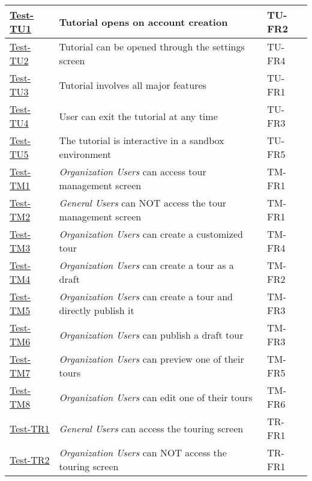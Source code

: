 \documentclass[12pt, titlepage]{article}
\begin{document}
\begin{table}[htpb!]
    \centering
    \begin{tabular}{|l|p{8cm}|p{3cm}|}
        \hline
        \hyperref[itm:Test-TU1]{Test-TU1} & Tutorial opens on account creation & TU-FR2 \\
        \hline
        \hyperref[itm:Test-TU2]{Test-TU2} & Tutorial can be opened through the settings screen & TU-FR4 \\
        \hline
        \hyperref[itm:Test-TU3]{Test-TU3} & Tutorial involves all major features & TU-FR1 \\
        \hline
        \hyperref[itm:Test-TU4]{Test-TU4} & User can exit the tutorial at any time & TU-FR3 \\
        \hline
        \hyperref[itm:Test-TU5]{Test-TU5} & The tutorial is interactive in a sandbox environment & TU-FR5 \\
        \hline
        \hyperref[itm:Test-TM1]{Test-TM1} & \textit{Organization Users} can access tour management screen & TM-FR1 \\
        \hline
        \hyperref[itm:Test-TM2]{Test-TM2} & \textit{General Users} can NOT access the tour management screen & TM-FR1 \\
        \hline
        \hyperref[itm:Test-TM3]{Test-TM3} & \textit{Organization Users} can create a customized tour & TM-FR4 \\
        \hline
        \hyperref[itm:Test-TM4]{Test-TM4} & \textit{Organization Users} can create a tour as a draft & TM-FR2 \\
        \hline
        \hyperref[itm:Test-TM5]{Test-TM5} & \textit{Organization Users} can create a tour and directly publish it & TM-FR3 \\
        \hline
        \hyperref[itm:Test-TM6]{Test-TM6} & \textit{Organization Users} can publish a draft tour & TM-FR3 \\
        \hline
        \hyperref[itm:Test-TM7]{Test-TM7} & \textit{Organization Users} can preview one of their tours & TM-FR5 \\
        \hline
        \hyperref[itm:Test-TM8]{Test-TM8} & \textit{Organization Users} can edit one of their tours & TM-FR6 \\
        \hline
        \hyperref[itm:Test-TR1]{Test-TR1} & \textit{General Users} can access the touring screen & TR-FR1 \\
        \hline
        \hyperref[itm:Test-TR2]{Test-TR2} & \textit{Organization Users} can NOT access the touring screen & TR-FR1 \\

\end{tabular}
\end{table}
\end{document}
